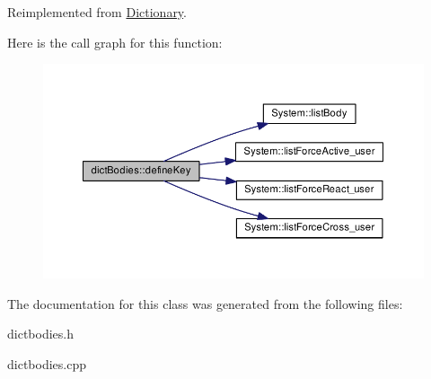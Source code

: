 Reimplemented from \hyperlink{class_dictionary_ad80581bdcda172a72ab700c968ba56bc}{Dictionary}.



Here is the call graph for this function\-:
\nopagebreak
\begin{figure}[H]
\begin{center}
\leavevmode
\includegraphics[width=350pt]{classdict_bodies_a532b7006f9278ee79718670ea6bf7d06_cgraph}
\end{center}
\end{figure}




The documentation for this class was generated from the following files\-:\begin{DoxyCompactItemize}
\item 
dictbodies.\-h\item 
dictbodies.\-cpp\end{DoxyCompactItemize}
